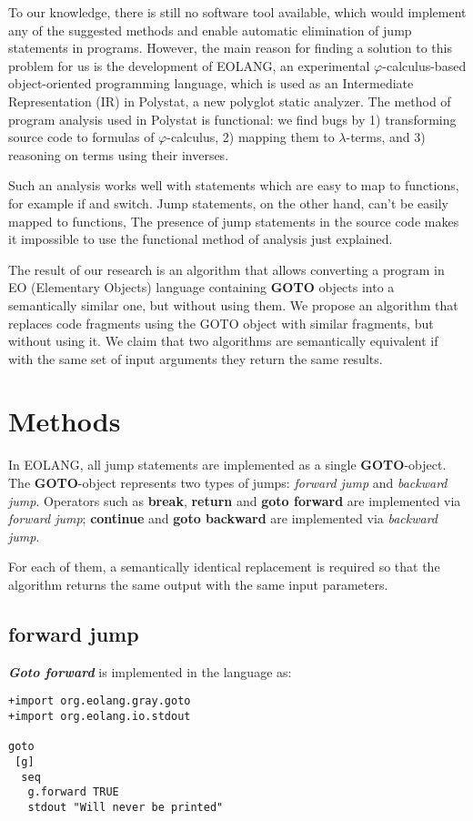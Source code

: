 \documentclass[two column]{article}
\begin{document}
To our knowledge, there is still no software tool available, which would implement any of the suggested methods and enable automatic elimination of jump statements in programs. However, the main reason for finding a solution to this problem for us is the development of EOLANG, an experimental \(\varphi\)-calculus-based object-oriented programming language, which is used as an Intermediate Representation (IR) in Polystat, a new polyglot static analyzer. The method of program analysis used in Polystat is functional: we find bugs by 1) transforming source code to formulas of \(\varphi\)-calculus, 2) mapping them to \(\lambda\)-terms, and 3) reasoning on terms using their inverses.

Such an analysis works well with statements which are easy to map to functions, for example if and switch. Jump statements, on the other hand, can't be easily mapped to functions, The presence of jump statements in the source code makes it impossible to use the functional method of analysis just explained.

The result of our research is an algorithm that allows converting a program in EO (Elementary Objects) language containing \textbf{GOTO} objects into a semantically similar one, but without using them. We propose an algorithm that replaces code fragments using the GOTO object with similar fragments, but without using it. We claim that two algorithms are semantically equivalent if with the same set of input arguments they return the same results.

\section{Methods}
In EOLANG, all jump statements are implemented as a single \textbf{GOTO}-object. The \textbf{GOTO}-object represents two types of jumps: \textit{forward jump} and \textit{backward jump}. Operators such as \textbf{break}, \textbf{return} and \textbf{goto forward} are implemented via \textit{forward jump}; \textbf{continue} and \textbf{goto backward} are implemented via \textit{backward jump}.

For each of them, a semantically identical replacement is required so that the algorithm returns the same output with the same input parameters.

\subsection{forward jump}
\textbf{\textit{Goto forward}} is implemented in the language as:
\begin{lstlisting}
+import org.eolang.gray.goto
+import org.eolang.io.stdout

goto
 [g]
  seq
   g.forward TRUE
   stdout "Will never be printed"
\end{lstlisting}
\end{document}
